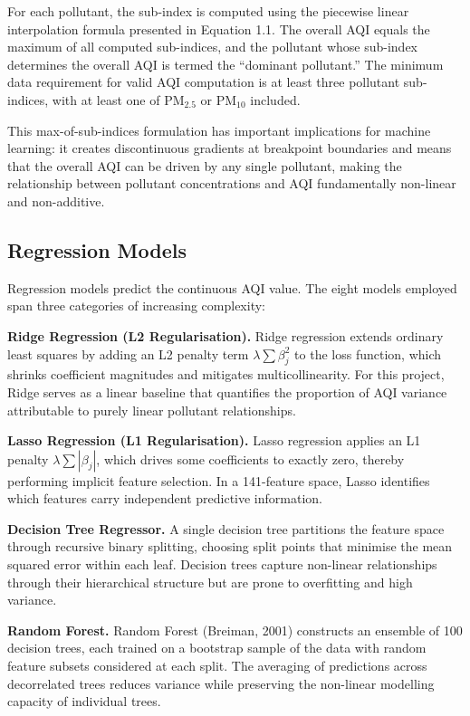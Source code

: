 \documentclass[12pt,a4paper]{report}
\begin{document}
For each pollutant, the sub-index is computed using the piecewise linear interpolation formula presented in Equation 1.1. The overall AQI equals the maximum of all computed sub-indices, and the pollutant whose sub-index determines the overall AQI is termed the ``dominant pollutant.'' The minimum data requirement for valid AQI computation is at least three pollutant sub-indices, with at least one of PM$_{2.5}$ or PM$_{10}$ included.

This max-of-sub-indices formulation has important implications for machine learning: it creates discontinuous gradients at breakpoint boundaries and means that the overall AQI can be driven by any single pollutant, making the relationship between pollutant concentrations and AQI fundamentally non-linear and non-additive.

\subsection{Regression Models}

Regression models predict the continuous AQI value. The eight models employed span three categories of increasing complexity:

\textbf{Ridge Regression (L2 Regularisation).} Ridge regression extends ordinary least squares by adding an L2 penalty term $\lambda \sum \beta_j^2$ to the loss function, which shrinks coefficient magnitudes and mitigates multicollinearity. For this project, Ridge serves as a linear baseline that quantifies the proportion of AQI variance attributable to purely linear pollutant relationships.

\textbf{Lasso Regression (L1 Regularisation).} Lasso regression applies an L1 penalty $\lambda \sum |\beta_j|$, which drives some coefficients to exactly zero, thereby performing implicit feature selection. In a 141-feature space, Lasso identifies which features carry independent predictive information.

\textbf{Decision Tree Regressor.} A single decision tree partitions the feature space through recursive binary splitting, choosing split points that minimise the mean squared error within each leaf. Decision trees capture non-linear relationships through their hierarchical structure but are prone to overfitting and high variance.

\textbf{Random Forest.} Random Forest (Breiman, 2001) constructs an ensemble of 100 decision trees, each trained on a bootstrap sample of the data with random feature subsets considered at each split. The averaging of predictions across decorrelated trees reduces variance while preserving the non-linear modelling capacity of individual trees.
\end{document}

